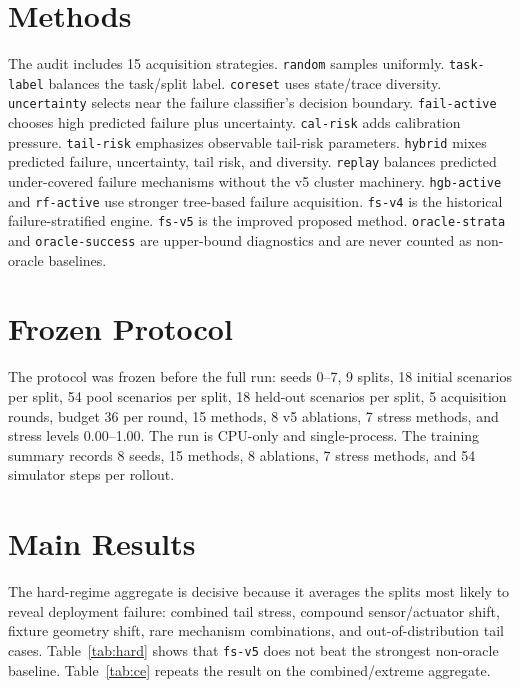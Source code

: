 \documentclass{article}
\begin{document}
\section{Methods}
The audit includes 15 acquisition strategies. \texttt{random} samples uniformly. \texttt{task-label} balances the task/split label. \texttt{coreset} uses state/trace diversity. \texttt{uncertainty} selects near the failure classifier's decision boundary. \texttt{fail-active} chooses high predicted failure plus uncertainty. \texttt{cal-risk} adds calibration pressure. \texttt{tail-risk} emphasizes observable tail-risk parameters. \texttt{hybrid} mixes predicted failure, uncertainty, tail risk, and diversity. \texttt{replay} balances predicted under-covered failure mechanisms without the v5 cluster machinery. \texttt{hgb-active} and \texttt{rf-active} use stronger tree-based failure acquisition. \texttt{fs-v4} is the historical failure-stratified engine. \texttt{fs-v5} is the improved proposed method. \texttt{oracle-strata} and \texttt{oracle-success} are upper-bound diagnostics and are never counted as non-oracle baselines.

\section{Frozen Protocol}
The protocol was frozen before the full run: seeds 0--7, 9 splits, 18 initial scenarios per split, 54 pool scenarios per split, 18 held-out scenarios per split, 5 acquisition rounds, budget 36 per round, 15 methods, 8 v5 ablations, 7 stress methods, and stress levels 0.00--1.00. The run is CPU-only and single-process. The training summary records 8 seeds, 15 methods, 8 ablations, 7 stress methods, and 54 simulator steps per rollout.

\section{Main Results}
The hard-regime aggregate is decisive because it averages the splits most likely to reveal deployment failure: combined tail stress, compound sensor/actuator shift, fixture geometry shift, rare mechanism combinations, and out-of-distribution tail cases. Table~\ref{tab:hard} shows that \texttt{fs-v5} does not beat the strongest non-oracle baseline. Table~\ref{tab:ce} repeats the result on the combined/extreme aggregate.
\end{document}
